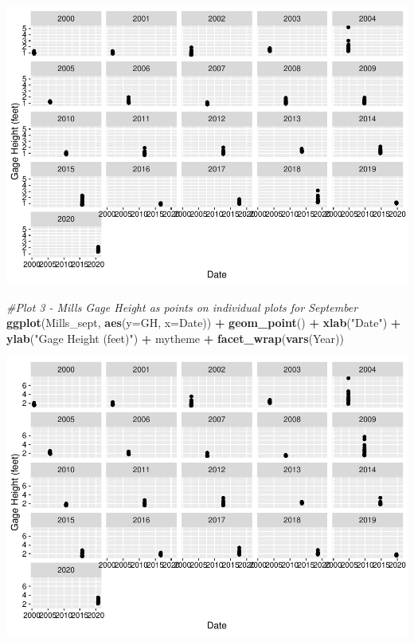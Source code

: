 \documentclass[12pt,]{article}
\newenvironment{Shaded}{\begin{snugshade}}{\end{snugshade}}
\newcommand{\CommentTok}[1]{\textcolor[rgb]{0.56,0.35,0.01}{\textit{#1}}}
\newcommand{\DataTypeTok}[1]{\textcolor[rgb]{0.13,0.29,0.53}{#1}}
\newcommand{\KeywordTok}[1]{\textcolor[rgb]{0.13,0.29,0.53}{\textbf{#1}}}
\newcommand{\NormalTok}[1]{#1}
\newcommand{\OperatorTok}[1]{\textcolor[rgb]{0.81,0.36,0.00}{\textbf{#1}}}
\newcommand{\StringTok}[1]{\textcolor[rgb]{0.31,0.60,0.02}{#1}}
\begin{document}
\includegraphics{Project_Template_files/figure-latex/Plots-2.pdf}

\begin{Shaded}
\begin{Highlighting}[]
\CommentTok{#Plot 3 - Mills Gage Height as points on individual plots for September}
\KeywordTok{ggplot}\NormalTok{(Mills_sept, }\KeywordTok{aes}\NormalTok{(}\DataTypeTok{y=}\NormalTok{GH, }\DataTypeTok{x=}\NormalTok{Date)) }\OperatorTok{+}
\StringTok{  }\KeywordTok{geom_point}\NormalTok{() }\OperatorTok{+}
\StringTok{  }\KeywordTok{xlab}\NormalTok{(}\StringTok{"Date"}\NormalTok{) }\OperatorTok{+}
\StringTok{  }\KeywordTok{ylab}\NormalTok{(}\StringTok{"Gage Height (feet)"}\NormalTok{) }\OperatorTok{+}
\StringTok{  }\NormalTok{mytheme }\OperatorTok{+}
\StringTok{  }\KeywordTok{facet_wrap}\NormalTok{(}\KeywordTok{vars}\NormalTok{(Year)) }
\end{Highlighting}
\end{Shaded}

\includegraphics{Project_Template_files/figure-latex/Plots-3.pdf}
\end{document}
